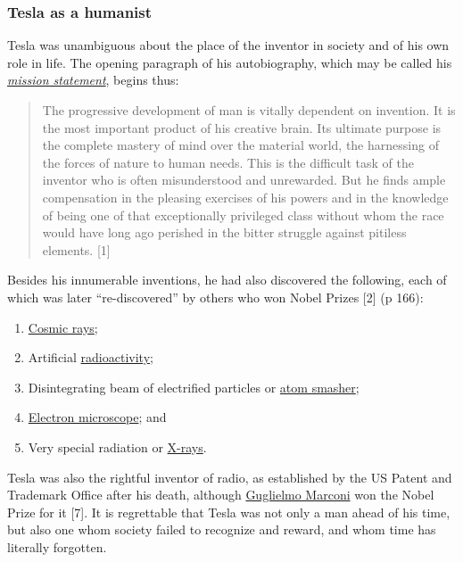 \documentclass[
  12pt,
  british,
  a4paper,
]{article}
\providecommand{\tightlist}{%
  \setlength{\itemsep}{0pt}\setlength{\parskip}{0pt}}
\begin{document}
\hypertarget{tesla-as-a-humanist}{%
\subsubsection{Tesla as a humanist}\label{tesla-as-a-humanist}}

Tesla was unambiguous about the place of the inventor in society and of
his own role in life. The opening paragraph of his autobiography, which
may be called his
\href{https://en.wikipedia.org/wiki/Mission_statement}{\emph{mission
statement}}, begins thus:

\begin{quote}
The progressive development of man is vitally dependent on invention. It
is the most important product of his creative brain. Its ultimate
purpose is the complete mastery of mind over the material world, the
harnessing of the forces of nature to human needs. This is the difficult
task of the inventor who is often misunderstood and unrewarded. But he
finds ample compensation in the pleasing exercises of his powers and in
the knowledge of being one of that exceptionally privileged class
without whom the race would have long ago perished in the bitter
struggle against pitiless elements. {[}1{]}
\end{quote}

Besides his innumerable inventions, he had also discovered the
following, each of which was later ``re-discovered'' by others who won
Nobel Prizes {[}2{]} (p 166):

\begin{enumerate}
\tightlist
\item
  \href{https://en.wikipedia.org/wiki/Cosmic_ray}{Cosmic rays};
\item
  Artificial
  \href{https://www.britannica.com/science/radioactivity}{radioactivity};
\item
  Disintegrating beam of electrified particles or
  \href{https://en.wikipedia.org/wiki/Particle_accelerator}{atom
  smasher};
\item
  \href{https://en.wikipedia.org/wiki/Electron_microscope}{Electron
  microscope}; and
\item
  Very special radiation or
  \href{https://en.wikipedia.org/wiki/X-ray}{X-rays}.
\end{enumerate}

Tesla was also the rightful inventor of radio, as established by the US
Patent and Trademark Office after his death, although
\href{https://en.wikipedia.org/wiki/Guglielmo_Marconi}{Guglielmo
Marconi} won the Nobel Prize for it {[}7{]}. It is regrettable that
Tesla was not only a man ahead of his time, but also one whom society
failed to recognize and reward, and whom time has literally forgotten.
\end{document}

